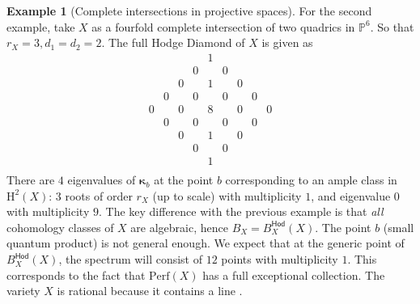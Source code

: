 \documentclass[12pt,a4paper]{amsart}
\theoremstyle{definition}
\newtheorem{example}[theorem]{Example}
\theoremstyle{remark}
\newcommand{\rH}{\mathrm{H}}
\begin{document}
\begin{example}[Complete intersections in projective spaces]
For the second example, take $X$ as a fourfold complete intersection of two quadrics in $\mathbb P^6$. So that $r_X=3, d_1=d_2=2$. The full Hodge Diamond of \(X\) is given as
\[
\begin{array}{ccccccccc}
 &  &  &  & 1 &  &  &  & \\
 &  &  & 0 &  & 0 &  &  & \\
 &  & 0 &  & 1 &  & 0 &  & \\
 & 0 &  & 0 &  & 0 &  & 0 & \\
0 &  & 0 &  & 8 &  & 0 &  & 0\\
 & 0 &  & 0 &  & 0 &  & 0 & \\
 &  & 0 &  & 1 &  & 0 &  & \\
 &  &  & 0 &  & 0 &  &  & \\
 &  &  &  & 1 &  &  &  & \\
\end{array}
\]
There are $4$ eigenvalues of $\boldsymbol{\kappa}_b$ at the point $b$ corresponding to an ample class in $\rH^2(X)$: $3$ roots of order $r_X$ (up to scale) with multiplicity $1$, and  eigenvalue $0$ with multiplicity $9$. The key difference with the previous example is that \emph{all} cohomology classes of $X$ are algebraic, hence $B_X=B_X^{\mathsf{Hod}}(X)$. The point $b$ (small quantum product) is not general enough. We expect that at the generic point of $B_X^{\mathsf{Hod}}(X)$, the spectrum will consist of $12$ points with multiplicity $1$. This corresponds to the fact that $\mathrm{Perf}(X)$ has a full exceptional collection. The variety $X$ is rational because it contains a line \cite{reid1972}.





\end{example}
\end{document}
